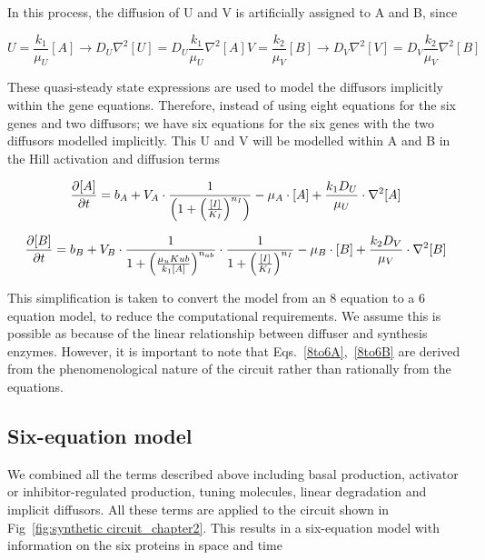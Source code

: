 In this process, the diffusion of U and V is artificially assigned to A and B, since

\begin{subequations}\label{[diffuser_artificial]}

\begin{equation}
    U = \frac{k_{1}}{\mu_{U}}[A] \longrightarrow D_{U}
    \nabla^2 [U] = D_{U}\frac{k_{1}}{\mu_{U}}  \nabla^2  [A]\label{eq:equation2}
\end{equation}

\begin{equation}
    V = \frac{k_{2}}{\mu_{V}}[B] \longrightarrow D_{V}
    \nabla^2 [V] =  D_{V}\frac{k_{2}}{\mu_{V}}  \nabla^2  [B]\label{eq:equation}
\end{equation}

\end{subequations}

These quasi-steady state expressions are used to model the diffusors implicitly within the gene equations.
Therefore, instead of using eight equations for the six genes and two diffusors;
we have six equations for the six genes with the two diffusors modelled implicitly.
This
U and V will be modelled within A and B in the Hill activation and diffusion terms

\begin{equation}\label{8to6A}
    \pdv{[A]}{t} = b_{A}+V_{A}\cdot \frac{1}{\left(1+\left(\frac{[I]}{K_{I}}\right)^{n_{I}}\right)}-\mu_{A}\cdot[A] + \frac{k_{1}D_{U}}{\mu_{U}}\cdot \nabla^2 [A]
\end{equation}

\begin{equation}\label{8to6B}
    \pdv{[B]}{t} = b_{B}+V_{B}\cdot\frac{1}{1+\left(\frac{\mu_{u}K{ub}}{k_{1}[A]}\right)^{n_{ab}}}\cdot\frac{1}{1+\left(\frac{[I]}{K_{I}}\right)^{n_{I}}}-\mu_{B}\cdot[B] + \frac{k_{2}D_{V}}{\mu_{V}}\cdot \nabla^2 [B]
\end{equation}

This simplification is taken to convert the model from an 8 equation to a 6 equation model, to reduce the computational requirements.
We assume this is possible as because of the linear relationship between diffuser and synthesis enzymes.
However, it is important to note that Eqs.~\ref{8to6A},~\ref{8to6B} are derived from the phenomenological nature of the circuit rather than rationally from the equations.

\subsection{Six-equation model}
We combined all the terms described above including basal production,
activator or inhibitor-regulated production, tuning molecules, linear degradation and implicit diffusors.
All these terms are applied to the circuit shown in Fig~\ref{fig:synthetic circuit_chapter2}.
This results in a six-equation model with information on the six proteins in space and time

